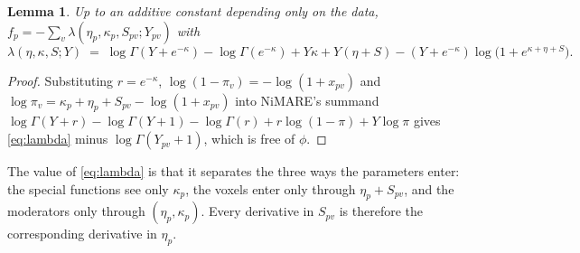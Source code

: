 \documentclass[11pt,a4paper]{article}
\theoremstyle{plain}
\newtheorem{lemma}[proposition]{Lemma}
\theoremstyle{definition}
\begin{document}
\begin{lemma}\label{lem:nb-lambda}
Up to an additive constant depending only on the data,
$f_p = -\sum_v \lambda(\eta_p, \kappa_p, S_{pv}; Y_{pv})$ with
\begin{equation}\label{eq:lambda}
  \lambda(\eta, \kappa, S; Y) \;=\; \log\Gamma(Y+e^{-\kappa}) - \log\Gamma(e^{-\kappa})
     + Y\kappa + Y(\eta+S) - (Y+e^{-\kappa})\log\bigl(1+e^{\kappa+\eta+S}\bigr).
\end{equation}
\end{lemma}

\begin{proof}
Substituting $r = e^{-\kappa}$, $\log(1-\pi_v) = -\log(1+x_{pv})$ and
$\log \pi_v = \kappa_p + \eta_p + S_{pv} - \log(1+x_{pv})$ into NiMARE's summand
$\log\Gamma(Y+r) - \log\Gamma(Y+1) - \log\Gamma(r) + r\log(1-\pi) + Y\log\pi$ gives
\eqref{eq:lambda} minus $\log\Gamma(Y_{pv}+1)$, which is free of $\phi$.
\end{proof}

The value of \eqref{eq:lambda} is that it separates the three ways the parameters enter: the
special functions see only $\kappa_p$, the voxels enter only through $\eta_p + S_{pv}$, and the
moderators only through $(\eta_p, \kappa_p)$. Every derivative in $S_{pv}$ is therefore the
corresponding derivative in $\eta_p$.
\end{document}
